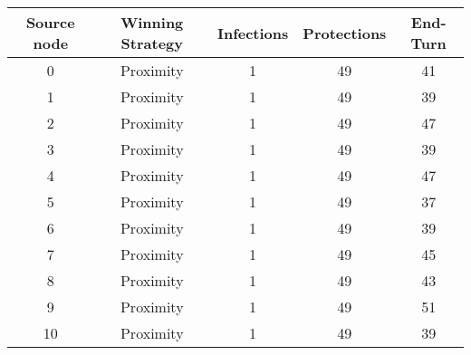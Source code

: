 \documentclass[results.tex]{subfiles}
\begin{document}
    \begin{center}
        \begin{tabular}{| c || c | c | c | c |}
            \hline
            {\bfseries Source node} & {\bfseries Winning Strategy} & {\bfseries Infections} & {\bfseries Protections}
            & {\bfseries End-Turn}
            \\  %
            \hline\hline
            0                       & Proximity                    & 1                      & 49                      & 41                   \\
            \hline
            1                       & Proximity                    & 1                      & 49                      & 39                   \\
            \hline
            2                       & Proximity                    & 1                      & 49                      & 47                   \\
            \hline
            3                       & Proximity                    & 1                      & 49                      & 39                   \\
            \hline
            4                       & Proximity                    & 1                      & 49                      & 47                   \\
            \hline
            5                       & Proximity                    & 1                      & 49                      & 37                   \\
            \hline
            6                       & Proximity                    & 1                      & 49                      & 39                   \\
            \hline
            7                       & Proximity                    & 1                      & 49                      & 45                   \\
            \hline
            8                       & Proximity                    & 1                      & 49                      & 43                   \\
            \hline
            9                       & Proximity                    & 1                      & 49                      & 51                   \\
            \hline
            10                      & Proximity                    & 1                      & 49                      & 39                   \\

\end{tabular}
\end{center}
\end{document}
